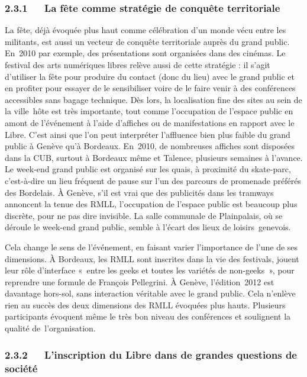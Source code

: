 \documentclass{FramateX}
\begin{document}
\begin{refsection}
\subsubsection*{2.3.1~~~La fête comme stratégie de conquête territoriale}
{}

La fête, déjà évoquée plus haut comme célébration d'un monde vécu entre
les militants, est aussi un vecteur de conquête territoriale auprès du
grand public. En~2010 par exemple, des présentations sont organisées
dans des cinémas. Le festival des arts numériques libres relève aussi
de cette stratégie : il s'agit d'utiliser la fête pour produire du
contact (donc du lieu) avec le grand public et en profiter pour essayer
de le sensibiliser voire de le faire venir à des conférences
accessibles sans bagage technique. Dès lors, la localisation fine des
sites au sein de la ville~hôte est très importante, tout comme
l'occupation de l'espace public en amont de l'événement à l'aide
d'affiches ou de manifestations en rapport avec le Libre. C'est ainsi
que l'on peut interpréter l'affluence bien plus faible du grand public
à Genève qu'à Bordeaux. En~2010, de nombreuses affiches sont disposées
dans la CUB, surtout à Bordeaux même et Talence, plusieurs semaines à
l'avance. Le week-end grand public est organisé sur les quais, à
proximité du skate-parc, c'est-à-dire un lieu fréquent de pause sur
l'un des parcours de promenade préférés des Bordelais. À Genève, s'il
est vrai que des publicités dans les tramways annoncent la tenue des
RMLL, l'occupation de l'espace public est beaucoup plus discrète, pour
ne pas dire invisible. La salle communale de Plainpalais, où se déroule
le week-end grand public, semble à l'écart des lieux de
loisirs~genevois.

Cela change le sens de l'événement, en faisant varier l'importance de
l'une de ses dimensions. À Bordeaux, les RMLL sont inscrites dans la
vie des festivals, jouent leur rôle d'interface
«~entre les geeks et toutes les variétés de
non-geeks~», pour reprendre une formule de François Pellegrini. À
Genève, l'édition~2012 est davantage hors-sol, sans interaction
véritable avec le grand public. Cela n'enlève rien au succès des deux
dimensions des RMLL évoquées plus hauts. Plusieurs participants
évoquent même le très bon niveau des conférences et soulignent la
qualité de~l'organisation. 

\subsubsection*{2.3.2~~~L'inscription du Libre dans de grandes questions de société}
{}


\end{refsection}
\end{document}
